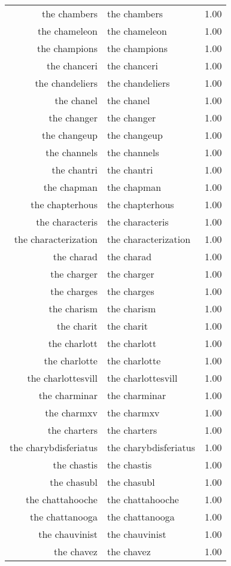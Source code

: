 \begin{table}[ht]
\begin{tabular}{rlr}
  the chambers & the chambers & 1.00 \\ 
  the chameleon & the chameleon & 1.00 \\ 
  the champions & the champions & 1.00 \\ 
  the chanceri & the chanceri & 1.00 \\ 
  the chandeliers & the chandeliers & 1.00 \\ 
  the chanel & the chanel & 1.00 \\ 
  the changer & the changer & 1.00 \\ 
  the changeup & the changeup & 1.00 \\ 
  the channels & the channels & 1.00 \\ 
  the chantri & the chantri & 1.00 \\ 
  the chapman & the chapman & 1.00 \\ 
  the chapterhous & the chapterhous & 1.00 \\ 
  the characteris & the characteris & 1.00 \\ 
  the characterization & the characterization & 1.00 \\ 
  the charad & the charad & 1.00 \\ 
  the charger & the charger & 1.00 \\ 
  the charges & the charges & 1.00 \\ 
  the charism & the charism & 1.00 \\ 
  the charit & the charit & 1.00 \\ 
  the charlott & the charlott & 1.00 \\ 
  the charlotte & the charlotte & 1.00 \\ 
  the charlottesvill & the charlottesvill & 1.00 \\ 
  the charminar & the charminar & 1.00 \\ 
  the charmxv & the charmxv & 1.00 \\ 
  the charters & the charters & 1.00 \\ 
  the charybdisferiatus & the charybdisferiatus & 1.00 \\ 
  the chastis & the chastis & 1.00 \\ 
  the chasubl & the chasubl & 1.00 \\ 
  the chattahooche & the chattahooche & 1.00 \\ 
  the chattanooga & the chattanooga & 1.00 \\ 
  the chauvinist & the chauvinist & 1.00 \\ 
  the chavez & the chavez & 1.00 \\ 

\end{tabular}
\end{table}
